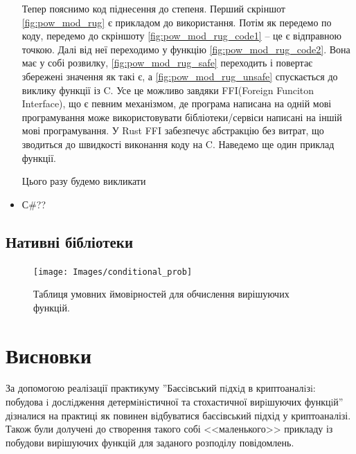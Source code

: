 \begin{itemize}
	Тепер пояснимо код піднесення до степеня. Перший скріншот \ref{fig:pow_mod_rug} є прикладом до використання. Потім як передемо по коду, передемо до скріншоту \ref{fig:pow_mod_rug_code1} -- це є відправною точкою. Далі від неї переходимо у функцію \ref{fig:pow_mod_rug_code2}. Вона має у собі розвилку, \ref{fig:pow_mod_rug_safe} переходить і повертає збережені значення як такі є, а \ref{fig:pow_mod_rug_unsafe} спускається до виклику функції із C. Усе це можливо завдяки FFI(Foreign Funciton Interface), що є певним механізмом, де програма написана на одній мові програмування може використовувати бібліотеки/сервіси написані на іншій мові програмування. У Rust FFI забезпечує абстракцію без витрат, що зводиться до швидкості виконання коду на C. Наведемо ще один приклад функції.
	
	Цього разу будемо викликати
	
	
	\item С#??
\end{itemize}

\subsection{Нативні бібліотеки}





\begin{figure}[h]
    \centering
    \texttt{[image: Images/conditional\_prob]}
    \caption{Таблиця умовних ймовірностей для обчислення вирішуючих функцій.}
    \label{fig:twisted_edward}
\end{figure}















\section{Висновки}
За допомогою реалізації практикуму ''Баєсiвський пiдхiд в криптоаналiзi: побудова i дослiдження детермiнiстичної та стохастичної вирiшуючих функцiй'' дізналися на практиці як повинен відбуватися баєсівський підхід у криптоаналізі. Також були долучені до створення такого собі <<маленького>> прикладу із побудови вирішуючих функцій для заданого розподілу повідомлень.
